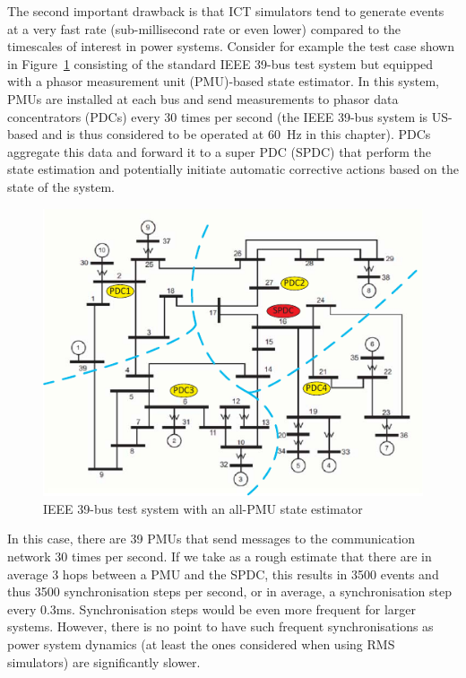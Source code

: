 The second important drawback is that ICT simulators tend to generate events at a very fast rate (sub-millisecond rate or even lower) compared to the timescales of interest in power systems. Consider for example the test case shown in Figure~\ref{fig:IEEE_PMU} consisting of the standard IEEE 39-bus test system but equipped with a phasor measurement unit (PMU)-based state estimator. In this system, PMUs are installed at each bus and send measurements to phasor data concentrators (PDCs) every 30 times per second (the IEEE 39-bus system is US-based and is thus considered to be operated at 60~Hz in this chapter). PDCs aggregate this data and forward it to a super PDC (SPDC) that perform the state estimation and potentially initiate automatic corrective actions based on the state of the system.

\begin{figure}
\centering
\includegraphics[width=0.8\linewidth]{Figs/IEEE39-PMU.pdf}
\caption{IEEE 39-bus test system with an all-PMU state estimator~\cite{GECOtestcase}}
\label{fig:IEEE_PMU}
\end{figure}

In this case, there are 39 PMUs that send messages to the communication network 30 times per second. If we take as a rough estimate that there are in average 3 hops between a PMU and the SPDC, this results in 3500 events and thus 3500 synchronisation steps per second, or in average, a synchronisation step every 0.3ms. Synchronisation steps would be even more frequent for larger systems. However, there is no point to have such frequent synchronisations as power system dynamics (at least the ones considered when using RMS simulators) are significantly slower.

